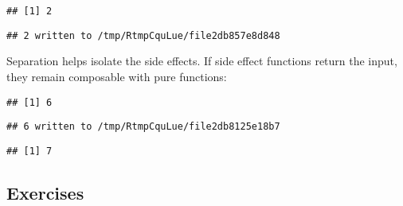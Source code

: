 \documentclass[]{book}
\newenvironment{Shaded}{\begin{snugshade}}{\end{snugshade}}
\newcommand{\DecValTok}[1]{\textcolor[rgb]{0.00,0.00,0.81}{#1}}
\newcommand{\KeywordTok}[1]{\textcolor[rgb]{0.13,0.29,0.53}{\textbf{#1}}}
\newcommand{\NormalTok}[1]{#1}
\newcommand{\OperatorTok}[1]{\textcolor[rgb]{0.81,0.36,0.00}{\textbf{#1}}}
\newcommand{\StringTok}[1]{\textcolor[rgb]{0.31,0.60,0.02}{#1}}
\begin{document}
\begin{verbatim}
## [1] 2
\end{verbatim}

\begin{verbatim}
## 2 written to /tmp/RtmpCquLue/file2db857e8d848
\end{verbatim}

Separation helps isolate the side effects.
If side effect functions return the input, they remain composable with pure functions:

\begin{Shaded}
\end{Shaded}

\begin{verbatim}
## [1] 6
\end{verbatim}

\begin{verbatim}
## 6 written to /tmp/RtmpCquLue/file2db8125e18b7
\end{verbatim}

\begin{verbatim}
## [1] 7
\end{verbatim}

\hypertarget{exercises-17}{%
\subsection{Exercises}\label{exercises-17}}
\end{document}
